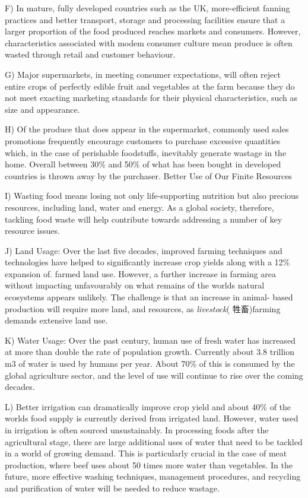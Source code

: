 \documentclass[UTF8,11pt]{ctexart}
\begin{document}
F) In mature, fully developed countries such as the UK, more-efficient fanning practices and better transport, storage and processing facilities ensure that a larger proportion of the food produced reaches markets and consumers. However, characteristics associated with modem consumer culture mean produce is often wasted through retail and customer behaviour.


G) Major supermarkets, in meeting consumer expectations, will often reject entire crops of perfectly edible fruit and vegetables at the farm because they do not meet exacting marketing standards for their physical characteristics, such as size and appearance.


H) Of the produce that does appear in the supermarket, commonly used sales promotions frequently encourage customers to purchase excessive quantities which, in the case of perishable foodstuffs, inevitably generate wastage in the home. Overall between 30\% and 50\% of what has been bought in developed countries is thrown away by the purchaser. Better Use of Our Finite Resources


I) Wasting food means losing not only life-supporting nutrition but also precious resources, including land, water and energy. As a global society, therefore, tackling food waste will help contribute towards addressing a number of key resource issues.


J) Land Usage: Over the last five decades, improved farming techniques and technologies have helped to significantly increase crop yields along with a 12\% expansion of. farmed land use. However, a further increase in farming area without impacting unfavourably on what remains of the worlds natural ecosystems appears unlikely. The challenge is that an increase in animal- based production will require more land, and resources, as\textit{ livestock}( 牲畜)farming demands extensive land use.


K) Water Usage: Over the past century, human use of fresh water has increased at more than double the rate of population growth. Currently about 3.8 trillion m3 of water is used by humans per year. About 70\% of this is consumed by the global agriculture sector, and the level of use will continue to rise over the coming decades.


L) Better irrigation can dramatically improve crop yield and about 40\% of the worlds food supply is currently derived from irrigated land. However, water used in irrigation is often sourced unsustainably. In processing foods after the agricultural stage, there are large additional uses of water that need to be tackled in a world of growing demand. This is particularly crucial in the case of meat production, where beef uses about 50 times more water than vegetables. In the future, more effective washing techniques, management procedures, and recycling and purification of water will be needed to reduce wastage.
\end{document}
